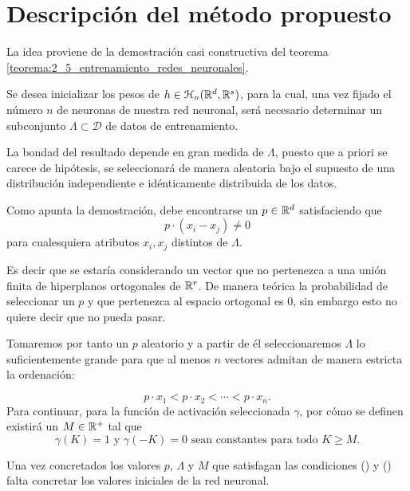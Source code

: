\section{Descripción del método propuesto}
\label{ch07:algoritmo-propuesto}
\begin{aportacionOriginal} %
    
La idea proviene de la demostración casi constructiva del teorema \ref{teorema:2_5_entrenamiento_redes_neuronales}.

Se desea inicializar los pesos de $h \in \mathcal{H}_n(\mathbb{R}^d,\mathbb{R}^s)$, para la cual, una vez fijado el número $n$ de neuronas de nuestra red neuronal, será necesario  determinar un subconjunto $\Lambda \subset\mathcal{D}$ de datos de entrenamiento. 

La bondad del resultado depende en gran medida de $\Lambda$, 
puesto que a priori se carece de hipótesis, se seleccionará 
de manera aleatoria bajo el supuesto de una distribución 
independiente e idénticamente distribuida de los datos. 

Como apunta la demostración, debe encontrarse un 
$p \in \mathbb{R}^d$ satisfaciendo que 
\begin{equation}
    p \cdot (x_i-x_j) \neq 0
\end{equation}
para cualesquiera
atributos $x_i,x_j$ distintos de $\Lambda$.  

Es decir que se estaría considerando un vector que no 
pertenezca a una unión finita de hiperplanos ortogonales de $\mathbb{R}^r$. 
De manera teórica la probabilidad de seleccionar un $p$ y 
que pertenezca al espacio ortogonal es $0$, sin embargo esto 
no quiere decir que no pueda pasar. 

Tomaremos por tanto un $p$ aleatorio y a partir de él 
seleccionaremos $\Lambda$ lo suficientemente grande para que
 al menos $n$ vectores admitan de manera estricta la ordenación: 

\begin{equation}\label{eq:method_inicializar_condition_desigualdad}
    p \cdot x_1 < 
    p \cdot x_2 
    < \cdots <
    p \cdot x_n.
\end{equation}
Para continuar, para la función de activación 
seleccionada $\gamma$, por cómo se definen 
existirá un $M \in \mathbb{R}^+$ tal que 
\begin{equation} \label{eq:method_inicializar_M}
    \gamma(K)=1 \text{ y } \gamma(-K)=0 
    \text{ sean constantes para todo }K \geq M.
\end{equation}

Una vez concretados los valores $p$, $\Lambda$ y $M$ que satisfagan las condiciones 
() 
y ()  
falta concretar los valores iniciales de la red neuronal. 


\end{aportacionOriginal}
